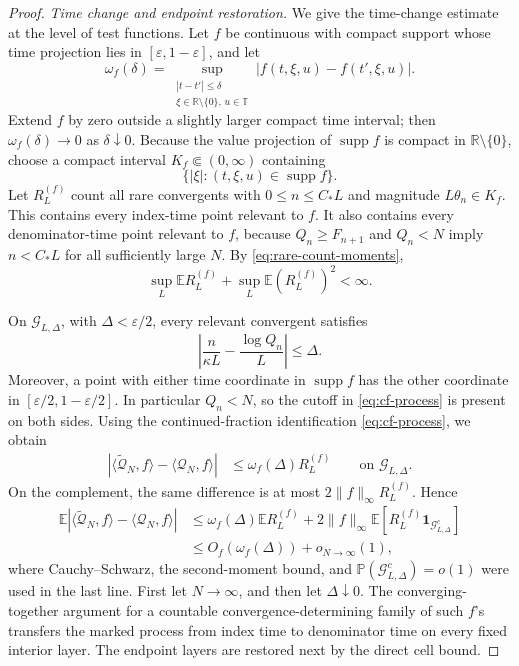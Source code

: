\documentclass[11pt]{article}
\numberwithin{equation}{section}
\theoremstyle{definition}
\newcommand{\T}{\mathbb T}
\newcommand{\R}{\mathbb R}
\newcommand{\E}{\mathbb E}
\newcommand{\Pp}{\mathbb P}
\newcommand{\1}{\mathbf 1}
\begin{document}
\begin{proof}
\medskip
\noindent\emph{Time change and endpoint restoration.}
We give the time-change estimate at the level of test functions.  Let
\(f\) be continuous with compact support whose time projection lies in
\([\varepsilon,1-\varepsilon]\), and let
\[
 \omega_f(\delta)=
 \sup_{\substack{|t-t'|\le\delta\\ \xi\in\R\setminus\{0\},\,u\in\T}}
 |f(t,\xi,u)-f(t',\xi,u)|.
\]
Extend \(f\) by zero outside a slightly larger compact time interval;
then \(\omega_f(\delta)\to0\) as \(\delta\downarrow0\).
Because the value projection of \(\operatorname{supp}f\) is compact in
\(\R\setminus\{0\}\), choose a compact interval
\(K_f\Subset(0,\infty)\) containing
\[
 \bigl\{|\xi|:(t,\xi,u)\in\operatorname{supp}f\bigr\}.
\]
Let \(R_L^{(f)}\) count all rare convergents with
\(0\le n\le C_*L\) and magnitude \(L\theta_n\in K_f\).  This
contains every index-time point relevant to \(f\).  It also contains
every denominator-time point relevant to \(f\), because
\(Q_n\ge F_{n+1}\) and \(Q_n<N\) imply \(n<C_*L\) for all sufficiently
large \(N\).  By
\eqref{eq:rare-count-moments},
\[
 \sup_L\E R_L^{(f)}+\sup_L\E(R_L^{(f)})^2<\infty.
\]

On \(\mathcal G_{L,\Delta}\), with
\(\Delta<\varepsilon/2\), every relevant convergent satisfies
\[
 \left|\frac{n}{\kappa L}-\frac{\log Q_n}{L}\right|\le\Delta.
\]
Moreover, a point with either time coordinate in
\(\operatorname{supp}f\) has the other coordinate in
\([\varepsilon/2,1-\varepsilon/2]\).  In particular \(Q_n<N\), so the
cutoff in \eqref{eq:cf-process} is present on both sides.  Using the
continued-fraction identification \eqref{eq:cf-process}, we obtain
\begin{align}
 \left|
 \langle\widetilde{\mathcal Q}_N,f\rangle
 -\langle\mathcal Q_N,f\rangle
 \right|
 &\le \omega_f(\Delta)R_L^{(f)}
 \qquad\text{on }\mathcal G_{L,\Delta}.
 \label{eq:test-function-time-change}
\end{align}
On the complement, the same difference is at most
\(2\|f\|_\infty R_L^{(f)}\).  Hence
\begin{align*}
 \E\left|
 \langle\widetilde{\mathcal Q}_N,f\rangle
 -\langle\mathcal Q_N,f\rangle
 \right|
 &\le
 \omega_f(\Delta)\E R_L^{(f)}
 +2\|f\|_\infty
   \E\left[R_L^{(f)}\1_{\mathcal G_{L,\Delta}^c}\right]\\
 &\le O_f(\omega_f(\Delta))+o_{N\to\infty}(1),
\end{align*}
where Cauchy--Schwarz, the second-moment bound, and
\(\Pp(\mathcal G_{L,\Delta}^c)=o(1)\) were used in the last line.
First let \(N\to\infty\), and then let \(\Delta\downarrow0\).
The converging-together argument for a countable
convergence-determining family of such \(f\)'s transfers the marked
process from index time to denominator time on every fixed interior
layer.  The endpoint layers are restored next by the direct cell
bound.


\end{proof}
\end{document}
